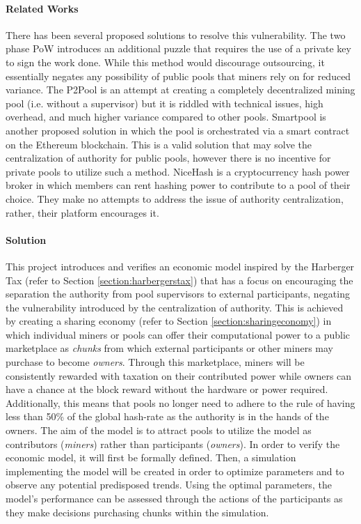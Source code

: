\paragraph{Related Works} There has been several proposed solutions to resolve this vulnerability. The two phase PoW \cite{bastiaan2015} introduces an additional puzzle that requires the use of a private key to sign the work done. While this method would discourage outsourcing, it essentially negates any possibility of public pools that miners rely on for reduced variance. The P2Pool is an attempt at creating a completely decentralized mining pool (i.e. without a supervisor) but it is riddled with technical issues, high overhead, and much higher variance compared to other pools. Smartpool \cite{smartpool2017} is another proposed solution in which the pool is orchestrated via a smart contract on the Ethereum blockchain. This is a valid solution that may solve the centralization of authority for public pools, however there is no incentive for private pools to utilize such a method. NiceHash is a cryptocurrency hash power broker in which members can rent hashing power to contribute to a pool of their choice. They make no attempts to address the issue of authority centralization, rather, their platform encourages it.

\paragraph{Solution} This project introduces and verifies an economic model inspired by the Harberger Tax (refer to Section \ref{section:harbergerstax}) that has a focus on encouraging the separation the authority from pool supervisors to external participants, negating the vulnerability introduced by the centralization of authority. This is achieved by creating a sharing economy (refer to Section \ref{section:sharingeconomy}) in which individual miners or pools can offer their computational power to a public marketplace as \textit{chunks} from which external participants or other miners may purchase to become \textit{owners}. Through this marketplace, miners will be consistently rewarded with taxation on their contributed power while owners can have a chance at the block reward without the hardware or power required. Additionally, this means that pools no longer need to adhere to the rule of having less than 50\% of the global hash-rate as the authority is in the hands of the owners. The aim of the model is to attract pools to utilize the model as contributors (\textit{miners}) rather than participants (\textit{owners}). In order to verify the economic model, it will first be formally defined. Then, a simulation implementing the model will be created in order to optimize parameters and to observe any potential predisposed trends. Using the optimal parameters, the model's performance can be assessed through the actions of the participants as they make decisions purchasing chunks within the simulation.

